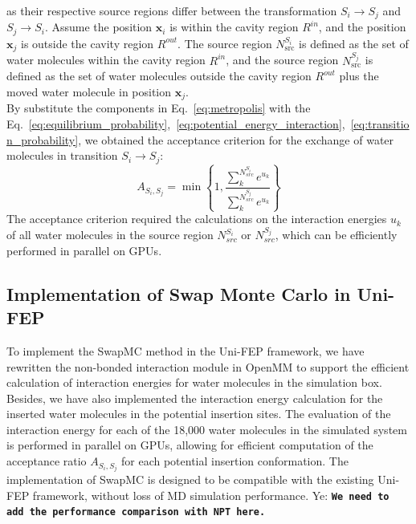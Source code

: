 \documentclass[journal=jacsat,manuscript=article]{achemso}
\newcommand*\YE[1]{Ye: \texttt{\textbf{#1}}}
\begin{document}
as their respective source regions differ between the transformation $S_i \to S_j$ and $S_j \to S_i$.
Assume the position $\mathbf{x}_i$ is within the cavity region $R^{in}$, and the position $\mathbf{x}_j$ is outside the cavity region $R^{out}$.
The source region $N_{\text{src}}^{S_i}$ is defined as the set of water molecules within the cavity region $R^{in}$, 
and the source region $N_{\text{src}}^{S_j}$ is defined as the set of water molecules outside the cavity region $R^{out}$ plus the moved water molecule in position $\textbf{x}_j$. \\
\newline
By substitute the components in Eq.~\ref{eq:metropolis} with the Eq.~\ref{eq:equilibrium_probability},~\ref{eq:potential_energy_interaction},~\ref{eq:transition_probability},
we obtained the acceptance criterion for the exchange of water molecules in transition $S_i \to S_j$:
\begin{equation}\label{eq:acceptance_criterion}
A_{S_i, S_j} = \min \left\{1, \frac{\sum^{N^{S_i}_{src}}_k{e^{u_k}}}{\sum^{N^{S_j}_{src}}_k{e^{u_k}}} \right\}
\end{equation}
\noindent The acceptance criterion required the calculations on the interaction energies $u_k$ of all water molecules in the source region $N^{S_i}_{src}$ or $N^{S_j}_{src}$,
which can be efficiently performed in parallel on GPUs.
\subsection{Implementation of Swap Monte Carlo in Uni-FEP}
To implement the SwapMC method in the Uni-FEP framework, we have rewritten the non-bonded interaction module in OpenMM to support the efficient calculation of interaction energies for water molecules in the simulation box.
Besides, we have also implemented the interaction energy calculation for the inserted water molecules in the potential insertion sites.
The evaluation of the interaction energy for each of the 18,000 water molecules in the simulated system is performed in parallel on GPUs,
allowing for efficient computation of the acceptance ratio $A_{S_i, S_j}$ for each potential insertion conformation.
The implementation of SwapMC is designed to be compatible with the existing Uni-FEP framework, 
without loss of MD simulation performance.
\YE{We need to add the performance comparison with NPT here.}
\end{document}
